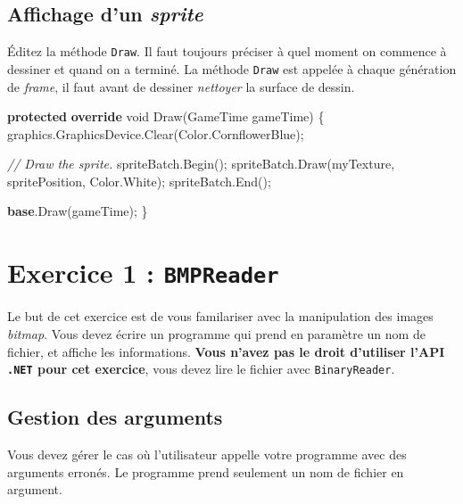 \documentclass[11pt, a4paper]{article}
\newenvironment{Shaded}{}{}
\newcommand{\KeywordTok}[1]{\textcolor[rgb]{0.00,0.44,0.13}{\textbf{{#1}}}}
\newcommand{\DataTypeTok}[1]{\textcolor[rgb]{0.56,0.13,0.00}{{#1}}}
\newcommand{\CommentTok}[1]{\textcolor[rgb]{0.38,0.63,0.69}{\textit{{#1}}}}
\newcommand{\FunctionTok}[1]{\textcolor[rgb]{0.02,0.16,0.49}{{#1}}}
\newcommand{\NormalTok}[1]{{#1}}
\begin{document}
\subsection{Affichage d'un \emph{sprite}}\label{affichage-dun-sprite}

Éditez la méthode \texttt{Draw}. Il faut toujours préciser à quel moment
on commence à dessiner et quand on a terminé. La méthode \texttt{Draw}
est appelée à chaque génération de \emph{frame}, il faut avant de
dessiner \emph{nettoyer} la surface de dessin.

\begin{Shaded}
\begin{Highlighting}[]
\KeywordTok{protected} \KeywordTok{override} \DataTypeTok{void} \FunctionTok{Draw}\NormalTok{(GameTime gameTime)}
\NormalTok{\{}
    \NormalTok{graphics.}\FunctionTok{GraphicsDevice}\NormalTok{.}\FunctionTok{Clear}\NormalTok{(Color.}\FunctionTok{CornflowerBlue}\NormalTok{);}

    \CommentTok{// Draw the sprite.}
    \NormalTok{spriteBatch.}\FunctionTok{Begin}\NormalTok{();}
    \NormalTok{spriteBatch.}\FunctionTok{Draw}\NormalTok{(myTexture, spritePosition, Color.}\FunctionTok{White}\NormalTok{);}
    \NormalTok{spriteBatch.}\FunctionTok{End}\NormalTok{();}

    \KeywordTok{base}\NormalTok{.}\FunctionTok{Draw}\NormalTok{(gameTime);}
\NormalTok{\}}
\end{Highlighting}
\end{Shaded}
\section{Exercice 1 : \texttt{BMPReader}}\label{exercice-1-bmpreader}

Le but de cet exercice est de vous familariser avec la manipulation des
images \emph{bitmap}. Vous devez écrire un programme qui prend en
paramètre un nom de fichier, et affiche les informations. \textbf{Vous
n'avez pas le droit d'utiliser l'API \texttt{.NET} pour cet exercice},
vous devez lire le fichier avec \texttt{BinaryReader}.

\subsection{Gestion des arguments}\label{gestion-des-arguments}

Vous devez gérer le cas où l'utilisateur appelle votre programme avec
des arguments erronés. Le programme prend seulement un nom de fichier en
argument.
\end{document}
